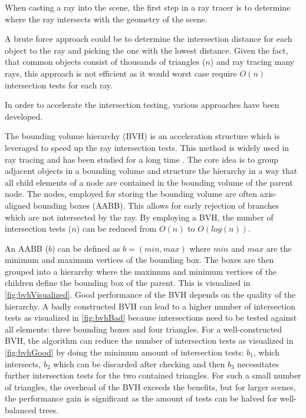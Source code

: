 When casting a ray into the scene, the first step in a ray tracer is to determine where the ray intersects with the geometry of the scene.

A brute force approach could be to determine the intersection distance for each object to the ray and picking the one with the lowest distance. Given the fact, that common objects consist of thousands of triangles ($n$) and ray tracing many rays, this approach is not efficient as it would worst case require $O(n)$ intersection tests for each ray.

In order to accelerate the intersection testing, various approaches have been developed.

The bounding volume hierarchy (\gls{BVH}) is an acceleration structure which is leveraged to speed up the ray intersection tests. This method is widely used in ray tracing and has been studied for a long time \cite{rubinWhittedBvh}. The core idea is to group adjacent objects in a bounding volume and structure the hierarchy in a way that all child elements of a node are contained in the bounding volume of the parent node. The nodes, employed for storing the bounding volume are often axis-aligned bounding boxes (\gls{AABB}). This allows for early rejection of branches which are not intersected by the ray. By employing a \gls{BVH}, the number of intersection tests ($n$) can be reduced from $O(n)$ to $O(log(n))$.

An \gls{AABB} ($b$) can be defined as $b = (min, max)$ where $min$ and $max$ are the minimum and maximum vertices of the bounding box. The boxes are then grouped into a hierarchy where the maximum and minimum vertices of the children define the bounding box of the parent. This is visualized in \autoref{fig:bvhVisualized}. Good performance of the \gls{BVH} depends on the quality of the hierarchy. A badly constructed \gls{BVH} can lead to a higher number of intersection tests as visualized in \autoref{fig:bvhBad} because intersections need to be tested against all elements: three bounding boxes and four triangles. For a well-constructed \gls{BVH}, the algorithm can reduce the number of intersection tests as visualized in \autoref{fig:bvhGood} by doing the minimum amount of intersection tests: $b_1$, which intersects, $b_2$ which can be discarded after checking and then $b_3$ necessitates further intersection tests for the two contained triangles. For such a small number of triangles, the overhead of the \gls{BVH} exceeds the benefits, but for larger scenes, the performance gain is significant as the amount of tests can be halved for well-balanced trees.

